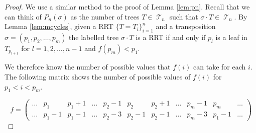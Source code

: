 \documentclass[10pt]{amsart} %
\theoremstyle{definition}
\DeclareMathOperator{\T}{\mathcal{T}}
\begin{document}
\begin{proof}
 We use a similar method to the proof of Lemma \ref{lem:pn}.  Recall that we can think of $P_n(\sigma)$  as the number of trees $T \in \T_n$ such that $\sigma \cdot T \in \T_n$. By Lemma \ref{lem:mcycles}, given a RRT $\{T = T_{i}\}_{i=1}^{n}$ and a transposition $\sigma  = (p_1,p_2,\dots,p_m)$ the labelled tree $\sigma  \cdot T$ is a RRT if and only if  $p_l$ is a leaf in $T_{p_{l+1}}$ for $l = 1,2,\dots,n-1$ and $f(p_m) < p_1$.  

We therefore know the number of possible values that $f(i)$ can take for each $i$. The following matrix shows the number of possible values of $f(i)$ for $p_1 < i < p_m$. 

 \[ f = \left(\begin{array}{ccccccccccc}
     \dots & p_1      & p_1 +1   & \dots & p_2 - 1 & p_2   & p_2 + 1 & \dots & p_m - 1 & p_m & \dots \\
     \dots & p_1 - 1  & p_1 - 1  & \dots & p_2 - 3 & p_2-1 & p_2-1   & \dots & p_m-3   & p_1-1 & \dots  
    \end{array} \right)
\]
\end{proof}
 
\end{document}
